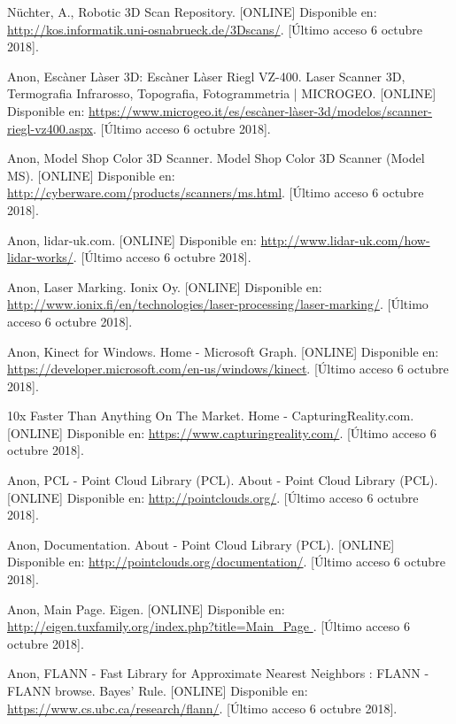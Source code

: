 \begin{thebibliography}{99}
 Nüchter, A., Robotic 3D Scan Repository. [ONLINE] Disponible en: \url{http://kos.informatik.uni-osnabrueck.de/3Dscans/}. [Último acceso 6 octubre 2018].


 Anon, Escàner Làser 3D: Escàner Làser Riegl VZ-400. Laser Scanner 3D, Termografia Infrarosso, Topografia, Fotogrammetria | MICROGEO. [ONLINE] Disponible en: \url{https://www.microgeo.it/es/escàner-làser-3d/modelos/scanner-riegl-vz400.aspx}. [Último acceso 6 octubre 2018].


 Anon, Model Shop Color 3D Scanner. Model Shop Color 3D Scanner (Model MS). [ONLINE] Disponible en: \url{http://cyberware.com/products/scanners/ms.html}. [Último acceso 6 octubre 2018].


 Anon, lidar-uk.com. [ONLINE] Disponible en: \url{http://www.lidar-uk.com/how-lidar-works/}. [Último acceso 6 octubre 2018].

 Anon, Laser Marking. Ionix Oy. [ONLINE] Disponible en: \url{http://www.ionix.fi/en/technologies/laser-processing/laser-marking/}. [Último acceso 6 octubre 2018].


 Anon, Kinect for Windows. Home - Microsoft Graph. [ONLINE] Disponible en: \url{https://developer.microsoft.com/en-us/windows/kinect}. [Último acceso 6 octubre 2018].


 10x Faster Than Anything On The Market. Home - CapturingReality.com. [ONLINE] Disponible en: \url{https://www.capturingreality.com/}. [Último acceso 6 octubre 2018].


 Anon, PCL - Point Cloud Library (PCL). About - Point Cloud Library (PCL). [ONLINE] Disponible en: \url{http://pointclouds.org/}. [Último acceso 6 octubre 2018].


 Anon, Documentation. About - Point Cloud Library (PCL). [ONLINE] Disponible en: \url{http://pointclouds.org/documentation/}. [Último acceso 6 octubre 2018].



 Anon, Main Page. Eigen. [ONLINE] Disponible en: \url{ http://eigen.tuxfamily.org/index.php?title=Main_Page }. [Último acceso 6 octubre 2018].

 Anon, FLANN - Fast Library for Approximate Nearest Neighbors : FLANN - FLANN browse. Bayes' Rule. [ONLINE] Disponible en: \url{https://www.cs.ubc.ca/research/flann/}. [Último acceso 6 octubre 2018].


\end{thebibliography}
